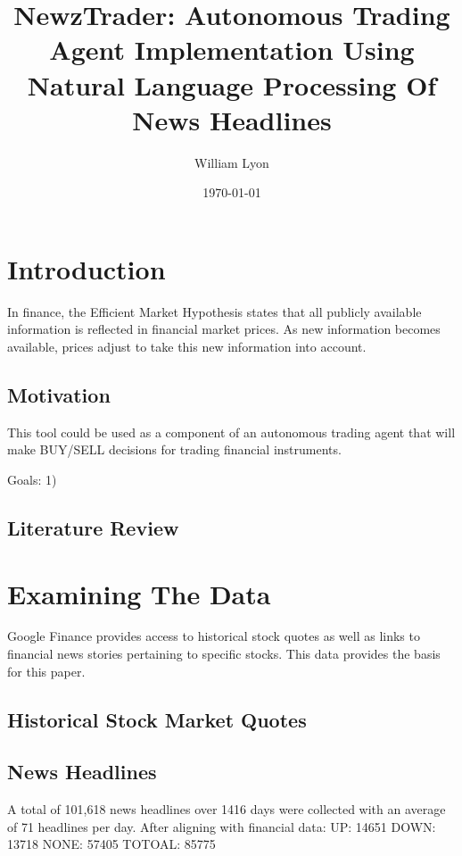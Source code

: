 \documentclass[]{article}
\begin{document}
\title{NewzTrader: Autonomous Trading Agent Implementation Using Natural Language Processing Of News Headlines}
\author{William Lyon}
\date{\today}
\maketitle


\section{Introduction}
In finance, the Efficient Market Hypothesis states that all publicly available information is reflected in financial market prices.  As new information becomes available, prices adjust to take this new information into account.  
\subsection{Motivation}
This tool could be used as a component of an autonomous trading agent that will make BUY/SELL decisions for trading financial instruments.

Goals: 1) 
\subsection{Literature Review}

\section{Examining The Data}
Google Finance provides access to historical stock quotes as well as links to financial news stories pertaining to specific stocks. This data provides the basis for this paper.
\subsection{Historical Stock Market Quotes}
\subsection{News Headlines}
A total of 101,618 news headlines over 1416 days were collected with an average of 71 headlines per day.  After aligning with financial data:
UP: 14651
DOWN: 13718
NONE: 57405
TOTOAL: 85775
\end{document}
